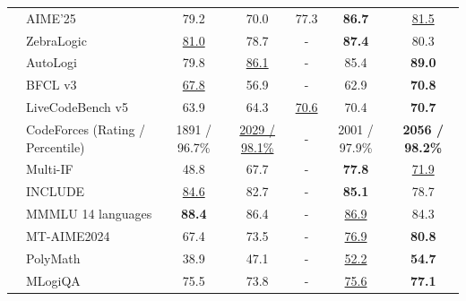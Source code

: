 \begin{table}[tbp]
{\begin{tabular}{@{}clccccc@{}}
& AIME'25 & 79.2 & 70.0 & 77.3 & \textbf{86.7} & \underline{81.5} \\
& ZebraLogic & \underline{81.0} & 78.7 & - & \textbf{87.4} & 80.3 \\
& AutoLogi & 79.8 & \underline{86.1} & - & 85.4 & \textbf{89.0} \\
\midrule
{} & BFCL v3 & \underline{67.8} & 56.9 & - & 62.9 & \textbf{70.8} \\
& LiveCodeBench v5 & 63.9 & 64.3 & \underline{70.6} & 70.4 & \textbf{70.7} \\
& CodeForces {\tiny{(Rating / Percentile)}} & 1891 / 96.7\% & \underline{2029 / 98.1\%} & - & 2001 / 97.9\% & \textbf{2056 / 98.2\%} \\
\midrule
{} & Multi-IF & 48.8 & 67.7 & - & \textbf{77.8} & \underline{71.9} \\
& INCLUDE & \underline{84.6} & 82.7 & - & \textbf{85.1} & 78.7 \\
& MMMLU {\tiny{14 languages}} & \textbf{88.4} & 86.4 & - & \underline{86.9} & 84.3 \\
& MT-AIME2024 & 67.4 & 73.5 & - & \underline{76.9} & \textbf{80.8} \\
& PolyMath & 38.9 & 47.1 & - & \underline{52.2} & \textbf{54.7} \\
& MLogiQA & 75.5 & 73.8 & - & \underline{75.6} & \textbf{77.1} \\
\bottomrule
\end{tabular}
}
\end{table}


